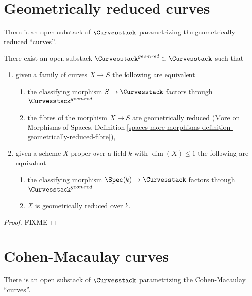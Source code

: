 \section{Geometrically reduced curves}
\label{section-geometrically-reduced}

\noindent
There is an open substack of $\Curvesstack$ parametrizing
the geometrically reduced ``curves''.

\begin{lemma}
\label{lemma-geometrically-reduced-curves}
There exist an open substack $\Curvesstack^{geomred} \subset \Curvesstack$
such that
\begin{enumerate}
\item given a family of curves $X \to S$ the following are equivalent
\begin{enumerate}
\item the classifying morphism $S \to \Curvesstack$ factors
through $\Curvesstack^{geomred}$,
\item the fibres of the morphism $X \to S$ are geometrically reduced
(More on Morphisms of Spaces, Definition
\ref{spaces-more-morphisms-definition-geometrically-reduced-fibre}),
\end{enumerate}
\item given a scheme $X$ proper over a field $k$ with $\dim(X) \leq 1$
the following are equivalent
\begin{enumerate}
\item the classifying morphism $\Spec(k) \to \Curvesstack$ factors
through $\Curvesstack^{geomred}$,
\item $X$ is geometrically reduced over $k$.
\end{enumerate}
\end{enumerate}
\end{lemma}

\begin{proof}
FIXME
\end{proof}





\section{Cohen-Macaulay curves}
\label{section-CM}

\noindent
There is an open substack of $\Curvesstack$ parametrizing
the Cohen-Macaulay ``curves''.

